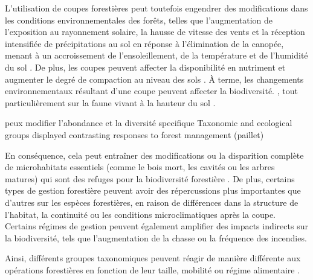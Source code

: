 
L'utilisation de coupes forestières peut toutefois engendrer des modifications dans les conditions environnementales des forêts, 
telles que l'augmentation de l'exposition au rayonnement solaire, la hausse de vitesse des vents et la réception intensifiée de précipitations au sol en réponse à l'élimination de la canopée, 
menant à un accroissement de l'ensoleillement, de la température et de l'humidité du sol \citep{Keenan1993ecologicaleffects,Lindo2003Microbialbiomass,Heithecker2007Edgerelatedgradients}.
De plus, les coupes peuvent affecter la disponibilité en nutriment et augmenter le degré de compaction au niveau des sols \citep{Covington1981Changesforest,Lindo2003Microbialbiomass,Battigelli2004Shorttermimpact,rousseauLongtermEffectsBiomass2018}. 
À terme, les changements environnementaux résultant d'une coupe peuvent affecter la biodiversité. \citep{Paillet2010Biodiversitydifferences,Fedrowitz2014Canretention,Chaudhary2016Impactforest}, 
tout particulièrement sur la faune vivant à la hauteur du sol \citep{Lindo2003Microbialbiomass,Chaudhary2016Impactforest,Kudrin2023metaanalysiseffects}.

peux modifier l'abondance et la diversité specifique
Taxonomic and ecological groups displayed contrasting responses to forest management (paillet)

En conséquence, cela peut entraîner des modifications ou la disparition complète de microhabitats essentiels (comme le bois mort, les cavités ou les arbres matures) qui sont des refuges pour la biodiversité forestière \citep{Paillet2010Biodiversitydifferences}. 
De plus, certains types de gestion forestière peuvent avoir des répercussions plus importantes que d'autres sur les espèces forestières, en raison de différences dans la structure de l'habitat, la continuité ou les conditions microclimatiques après la coupe. 
Certains régimes de gestion peuvent également amplifier des impacts indirects sur la biodiversité, tels que l'augmentation de la chasse ou la fréquence des incendies.

Ainsi, différents groupes taxonomiques peuvent réagir de manière différente aux opérations forestières en fonction de leur taille, mobilité ou régime alimentaire \citep{Barlow2007Quantifyingbiodiversity,Stork2009Vulnerabilityresilience}.


